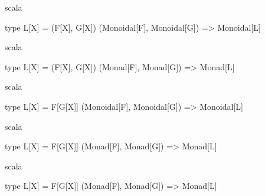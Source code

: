 \documentclass{beamer}
\begin{document}
\begin{frame}[fragile]

  \centering
  \large

  \begin{cminted}{scala}

type L[X] = (F[X], G[X])
(Monoidal[F], Monoidal[G]) => Monoidal[L]

  \end{cminted}

\end{frame}

\begin{frame}[fragile]

  \centering
  \large

  \begin{cminted}{scala}

type L[X] = (F[X], G[X])
(Monad[F], Monad[G]) => Monad[L]

  \end{cminted}

\end{frame}

\begin{frame}[fragile]

  \centering
  \large

  \begin{cminted}{scala}

type L[X] = F[G[X]]
(Monoidal[F], Monoidal[G]) => Monoidal[L]

  \end{cminted}

\end{frame}

\begin{frame}[fragile]

  \centering
  \large

  \begin{cminted}{scala}

type L[X] = F[G[X]]
(Monad[F], Monad[G]) => Monad[L]

  \end{cminted}

\end{frame}

\begin{frame}[fragile]

  \centering
  \large

  \begin{cminted}{scala}

type L[X] = F[G[X]]
(Monad[F], Monad[G]) => Monad[L] %

  \end{cminted}

\end{frame}
\end{document}
